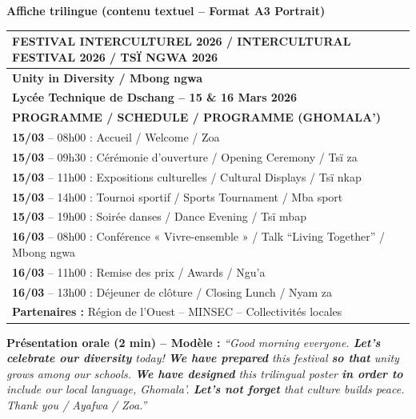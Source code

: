 \documentclass[11pt]{article}
\begin{document}
\begin{corrige}
\textbf{Affiche trilingue (contenu textuel -- Format A3 Portrait)}

\begin{center}
\begin{tabularx}{\linewidth}{|X|}\hline
\rowcolor{popblueL} \textbf{FESTIVAL INTERCULTUREL 2026 / INTERCULTURAL FESTIVAL 2026 / TSÏ NGWA 2026} \\ \hline
\textbf{Unity in Diversity / Mbong ngwa} \\ \hline
\textbf{Lycée Technique de Dschang -- 15 \& 16 Mars 2026} \\ \hline
\textbf{PROGRAMME / SCHEDULE / PROGRAMME (GHOMALA')} \\ \hline
\textbf{15/03} -- 08h00 : Accueil / Welcome / Zoa \\
\textbf{15/03} -- 09h30 : Cérémonie d'ouverture / Opening Ceremony / Tsï za \\
\textbf{15/03} -- 11h00 : Expositions culturelles / Cultural Displays / Tsï nkap \\
\textbf{15/03} -- 14h00 : Tournoi sportif / Sports Tournament / Mba sport \\
\textbf{15/03} -- 19h00 : Soirée danses / Dance Evening / Tsï mbap \\
\textbf{16/03} -- 08h00 : Conférence « Vivre-ensemble » / Talk ``Living Together'' / Mbong ngwa \\
\textbf{16/03} -- 11h00 : Remise des prix / Awards / Ngu'a \\
\textbf{16/03} -- 13h00 : Déjeuner de clôture / Closing Lunch / Nyam za \\ \hline
\textbf{Partenaires :} Région de l'Ouest -- MINSEC -- Collectivités locales \\ \hline
\end{tabularx}
\end{center}

\textbf{Présentation orale (2 min) -- Modèle :}
\emph{``Good morning everyone. \textbf{Let's celebrate our diversity} today! \textbf{We have prepared} this festival \textbf{so that} unity grows among our schools. \textbf{We have designed} this trilingual poster \textbf{in order to} include our local language, Ghomala'. \textbf{Let's not forget} that culture builds peace. Thank you / Ayafwa / Zoa.''}
\end{corrige}
\end{document}
